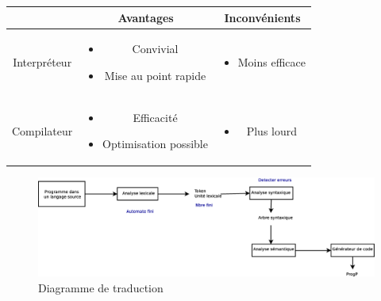 \documentclass[12pt,a4paper,openany]{book}
\begin{document}
	\begin{tabular}{c||c|c}
		&Avantages&Inconvénients\\
		\hline
		Interpréteur &
		\begin{minipage}{0.3\textwidth}
			\begin{itemize}
				\item Convivial
				\item Mise au point rapide
			\end{itemize}
		\end{minipage}&
		\begin{minipage}{0.3\textwidth}
			\begin{itemize}
				\item Moins efficace
			\end{itemize}
		\end{minipage}
		\\
		\hline
		Compilateur&
		\begin{minipage}{0.3\textwidth}
			\begin{itemize}
				\item Efficacité
				\item Optimisation possible
			\end{itemize}
		\end{minipage}&
		\begin{minipage}{0.3\textwidth}
			\begin{itemize}
				\item Plus lourd
			\end{itemize}
		\end{minipage}
	\end{tabular}

	\begin{figure}[H]
		\centering
		\includegraphics[width=19cm]{Diagramme3.eps}
		\caption{Diagramme de traduction}
	\end{figure}
\end{document}
